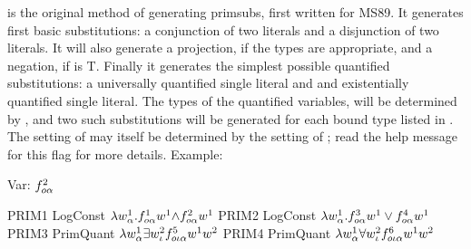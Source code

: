  is the original method of generating primsubs, first written for MS89.
It generates first basic substitutions: a conjunction of two literals and a disjunction
of two literals. It will also generate a projection, if the types are appropriate, and a
negation, if  is T. Finally it generates the simplest possible
quantified substitutions: a universally quantified single literal and and existentially
quantified single literal. The types of the quantified variables, will be determined
by , and two such substitutions will be generated for each
bound type listed in .
The setting of  may itself be determined by the setting of
; read the help message for this flag for more details. Example:

\begin{tpsexample}
Var:   \(f\sp{{2}}\sb{o\alpha}\)

     PRIM1   LogConst     \(\lambda w \sp{{1}}\sb{\alpha} .f \sp{{1}}\sb{o\alpha}  w \sp{{1}}  \mathord{\wedge} f \sp{{2}}\sb{o\alpha}  w \sp{{1}}\)
     PRIM2   LogConst     \(\lambda w \sp{{1}}\sb{\alpha} .f \sp{{3}}\sb{o\alpha}  w \sp{{1}}  \lor f \sp{{4}}\sb{o\alpha}  w \sp{{1}}\)
     PRIM3   PrimQuant   \(\lambda w \sp{{1}}\sb{\alpha}   \exists w \sp{{2}}\sb{\iota}  f \sp{{5}}\sb{o\iota\alpha}  w \sp{{1}}  w \sp{{2}}\)
     PRIM4   PrimQuant   \(\lambda w \sp{{1}}\sb{\alpha}   \forall w \sp{{2}}\sb{\iota}  f \sp{{6}}\sb{o\iota\alpha}  w \sp{{1}}  w \sp{{2}}\)
\end{tpsexample}


